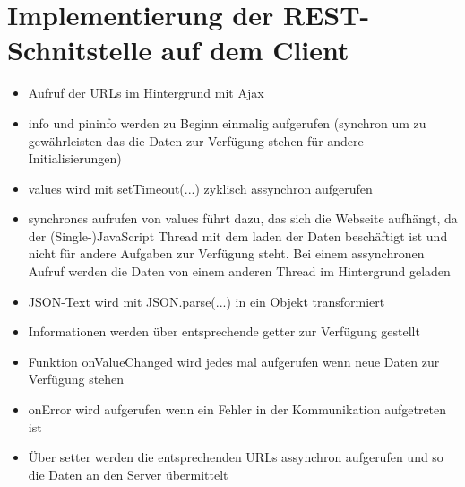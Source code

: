 
\section{Implementierung der REST-Schnitstelle auf dem Client}

\begin{itemize}
	\item Aufruf der URLs im Hintergrund mit Ajax
	\item info und pininfo werden zu Beginn einmalig aufgerufen (synchron um zu 
	      gewährleisten das die Daten zur Verfügung stehen für andere Initialisierungen)
	\item values wird mit setTimeout(...) zyklisch assynchron aufgerufen
	\item synchrones aufrufen von values führt dazu, das sich die Webseite aufhängt, da
	      der (Single-)JavaScript Thread mit dem laden der Daten beschäftigt ist und nicht
	      für andere Aufgaben zur Verfügung steht. Bei einem assynchronen Aufruf werden 
	      die Daten von einem anderen Thread im Hintergrund geladen
	\item JSON-Text wird mit JSON.parse(...) in ein Objekt transformiert
	\item Informationen werden über entsprechende getter zur Verfügung gestellt
	\item Funktion onValueChanged wird jedes mal aufgerufen wenn neue Daten zur 
	      Verfügung stehen
	\item onError wird aufgerufen wenn ein Fehler in der Kommunikation aufgetreten ist
	\item Über setter werden die entsprechenden URLs assynchron aufgerufen und so die 
	      Daten an den Server übermittelt
\end{itemize}